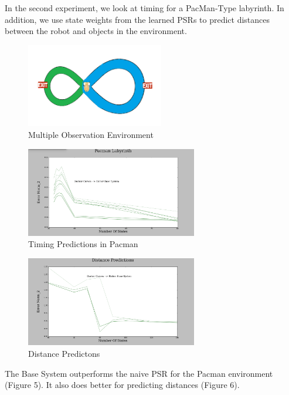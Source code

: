 \documentclass{acm_proc_article-sp}
\begin{document}
{In the second experiment, we look at timing for a PacMan-Type labyrinth. In addition, we use state weights from the learned PSRs to predict distances between the robot and objects in the environment. 

\begin{figure}[ht!]
\centering
\includegraphics[width=60mm]{lucasplots/monImages/doubleLoopImageMO.png}
\caption{Multiple Observation Environment \label{overflow}}
\end{figure}


\begin{figure}[ht!]
\centering
\includegraphics[width=75mm]{lucasplots/monImages/PacmanLabyrinth.png}
\caption{Timing Predictions in Pacman \label{overflow}}
\end{figure}

\begin{figure}[ht!]
\centering
\includegraphics[width=75mm]{lucasplots/monImages/Distance_Predictions.png}
\caption{Distance Predictons\label{overflow}}
\end{figure}

The Base System outperforms the naive PSR for the Pacman environment (Figure 5). It also does better for predicting distances (Figure 6). 

}
\end{document}
